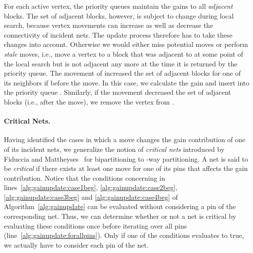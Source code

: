 \documentclass[runningheads,a4paper]{llncs}
\begin{document}
For each active vertex, the priority queues maintain the gains to all \emph{adjacent} blocks.
The set of adjacent blocks, however, is subject to change during local search, because vertex movements can increase as
well as decrease the connectivity of incident nets. The update process therefore has to take these changes into account.
Otherwise we would either miss potential moves or perform \emph{stale} moves, i.e., move a vertex to a block
that was adjacent to  at some point of the local search but is not adjacent any more at the time it is returned by the priority queue.
The movement of  increased the set of adjacent blocks  for one of its neighbors  if  before the move.
In this case, we calculate the gain  and insert  into the priority queue . Similarly, if the movement decreased the set of
adjacent blocks (i.e.,  after the move), we remove the vertex from .

\paragraph{Critical Nets.}
Having identified the cases in which a move changes the gain contribution of one of its incident nets,
we generalize the notion of \emph{critical nets} introduced by Fiduccia and Mattheyses~\cite{FM82} for bipartitioning to -way partitioning. 
A net is said to be \emph{critical} if there exists at least one move for one of its pins that affects the gain contribution. 
Notice that the conditions concerning  in lines~\ref{alg:gainupdate:case1beg}, \ref{alg:gainupdate:case2beg}, \ref{alg:gainupdate:case3beg} and \ref{alg:gainupdate:case4beg} of
Algorithm~\ref{alg:gainupdate} can be evaluated without considering a pin of the corresponding net. Thus, we can determine whether
or not a net is critical by evaluating these conditions once before iterating over all pins (line~\ref{alg:gainupdate:forallpins}). Only if one of the conditions evaluates to true, we actually have to consider each pin of the net.     
\end{document}
